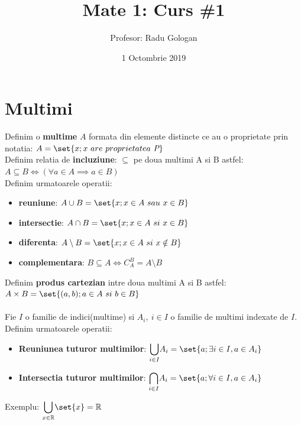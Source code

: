 \documentclass{article}
\title{Mate 1: Curs \#1}
\author{Profesor: Radu Gologan}
\date{1 Octombrie 2019}
\begin{document}
    
    \maketitle
    \section{Multimi}
        Definim o \textbf{multime} $A$ formata din elemente distincte ce au o proprietate prin notatia: $A = \set{x;x\ are\ proprietatea\ \textit{P}}$ \\
        Definim relatia de \textbf{incluziune}: $\subseteq$ pe doua multimi A si B astfel:\\
        $A \subseteq B \iff (\forall a \in A \implies a \in B)$\\
        Definim urmatoarele operatii:
        \begin{itemize}
            \item \textbf{reuniune}: $A \cup B = \set{x; x \in A\ sau\ x\in B}$
            \item \textbf{intersectie}: $A \cap B = \set{x; x \in A\ si\ x\in B}$
            \item \textbf{diferenta}: $A \setminus B = \set{x; x \in A\ si\ x\notin B}$
            \item \textbf{complementara}: $B \subseteq A \iff C^B_A = A \setminus B$
        \end{itemize}
        Definim \textbf{produs cartezian} intre doua multimi A si B astfel:\\
        $A\times B = \set{(a, b); a \in A\ si\ b\in B}$\\ \\
        Fie $I$ o familie de indici(multime) si $A_i,\ i\in I$ o familie de multimi indexate de $I$.
        Definim urmatoarele operatii:
        \begin{itemize}
            \item \textbf{Reuniunea tuturor multimilor}: $\displaystyle{\bigcup_{i\in I}} A_i = \set{a; \exists i \in I, a \in A_i}$
            \item \textbf{Intersectia tuturor multimilor}: $\displaystyle{\bigcap_{i\in I}} A_i = \set{a; \forall i \in I, a \in A_i}$
        \end{itemize}
        Exemplu: $\displaystyle{\bigcup_{x\in\mathbb{R}}}\set{x}=\mathbb{R}$
\end{document}
